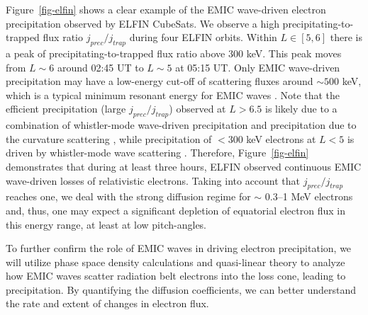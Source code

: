 \documentclass[
  letterpaper,
  DIV=11,
  numbers=noendperiod]{scrartcl}
\begin{document}
Figure~\ref{fig-elfin} shows a clear example of the EMIC wave-driven electron precipitation observed by ELFIN CubeSats. We observe a high precipitating-to-trapped flux ratio \(j_{prec}/j_{trap}\) during four ELFIN orbits.
Within \(L \in [5,6]\) there is a peak of precipitating-to-trapped flux ratio above \(300\) keV. This peak moves from \(L \sim 6\) around 02:45 UT to \(L \sim 5\) at 05:15 UT. Only EMIC wave-driven precipitation may have a low-energy cut-off of scattering fluxes around \(\sim 500\) keV, which is a typical minimum resonant energy for EMIC waves \citep[see the identification of other EMIC wave-driven precipitation events with similar precipitating-to-trapped ratios in][]{anNonresonantScatteringRelativistic2022, angelopoulosEnergeticElectronPrecipitation2023}. Note that the efficient precipitation (large \(j_{prec}/j_{trap}\)) observed at \(L>6.5\) is likely due to a combination of whistler-mode wave-driven precipitation \citep{shiRoleULFWaves2022} and precipitation due to the curvature scattering \citep{wilkinsStatisticalCharacteristicsElectron2023}, while precipitation of \(<300\) keV electrons at \(L<5\) is driven by whistler-mode wave scattering \citep[see similar examples of quasi-periodical precipitation on the dusk flank in][]{artemyevRoleDuctingRelativistic2021}.
Therefore, Figure~\ref{fig-elfin} demonstrates that during at least three hours, ELFIN observed continuous EMIC wave-driven losses of relativistic electrons. Taking into account that \(j_{prec}/j_{trap}\) reaches one, we deal with the strong diffusion regime for \(\sim\) 0.3--1 MeV electrons and, thus, one may expect a significant depletion of equatorial electron flux in this energy range, at least at low pitch-angles.

To further confirm the role of EMIC waves in driving electron precipitation, we will utilize phase space density calculations and quasi-linear theory to analyze how EMIC waves scatter radiation belt electrons into the loss cone, leading to precipitation. By quantifying the diffusion coefficients, we can better understand the rate and extent of changes in electron flux.
\end{document}
